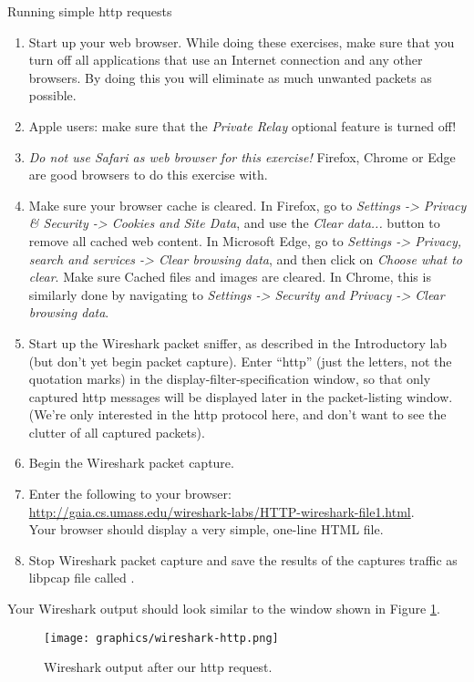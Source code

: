 \begin{exercise}{Running simple \ac{http} requests}
\begin{enumerate}
	\item Start up your web browser. While doing these exercises, make sure that you turn off all applications that use an Internet connection and any other browsers. By doing this you will eliminate as much unwanted packets as possible.
	\item Apple users: make sure that the \emph{Private Relay} optional feature is turned off!
	\item \emph{Do not use Safari as web browser for this exercise!} Firefox, Chrome or Edge are good browsers to do this exercise with.
	\item Make sure your browser cache is cleared. In Firefox, go to \emph{Settings -> Privacy \& Security -> Cookies and Site Data}, and use the \emph{Clear data...} button to remove all cached web content. In Microsoft Edge, go to \emph{Settings -> Privacy, search and services -> Clear browsing data}, and then click on \emph{Choose what to clear}. Make sure Cached files and images are cleared. In Chrome, this is similarly done by navigating to \emph{Settings -> Security and Privacy -> Clear browsing data}.
	\item Start up the Wireshark packet sniffer, as described in the Introductory lab (but don’t yet begin packet capture). Enter ``http'' (just the letters, not the quotation marks) in the display-filter-specification window, so that only captured \ac{http} messages will be displayed later in the packet-listing window. (We’re only interested in the \ac{http} protocol here, and don’t want to see the clutter of all captured packets). 
	\item Begin the Wireshark packet capture. 
	\item Enter the following to your browser:\\\url{http://gaia.cs.umass.edu/wireshark-labs/HTTP-wireshark-file1.html}. \\Your browser should display a very simple, one-line HTML file. 
	\item Stop Wireshark packet capture and save the results of the captures traffic as libpcap file called . 
\end{enumerate}

Your Wireshark output should look similar to the window shown in Figure \ref{fig:wireshark-http}.

\begin{figure}
	\centering
	\texttt{[image: graphics/wireshark-http.png]}	
	\caption{Wireshark output after our \ac{http} request.}
	\label{fig:wireshark-http}
\end{figure}


\end{exercise}

